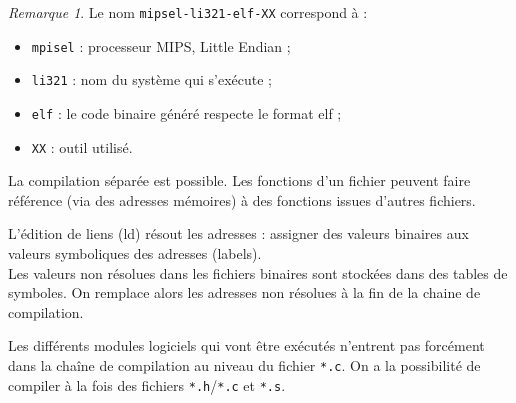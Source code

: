 \documentclass[11pt,english,french]{scrreprt}
\theoremstyle{remark}
\newtheorem*{rem*}{Remarque}
\theoremstyle{definition}
\begin{document}
\begin{rem*}
	Le nom \lstinline!mipsel-li321-elf-XX! correspond à :\begin{itemize}
		\item \lstinline!mpisel! : processeur MIPS, Little Endian ;
		\item \lstinline!li321! : nom du système qui s'exécute ;
		\item \lstinline!elf! : le code binaire généré respecte le format elf ;
		\item \lstinline!XX! : outil utilisé.
	\end{itemize}
\end{rem*}

\begin{figure}[h!]
  \centering
  \qquad            
\end{figure}

La compilation séparée est possible. Les fonctions d'un fichier peuvent faire référence (via des adresses mémoires) à des fonctions issues d'autres fichiers.

L'édition de liens (ld) résout les adresses : assigner des valeurs binaires aux valeurs symboliques des adresses (labels).\\
Les valeurs non résolues dans les fichiers binaires sont stockées dans des tables de symboles. On remplace alors les adresses non résolues à la fin de la chaine de compilation.

Les différents modules logiciels qui vont être exécutés n'entrent pas forcément dans la chaîne de compilation au niveau du fichier \lstinline!*.c!. On a la possibilité de compiler à la fois des fichiers \lstinline!*.h!/\lstinline!*.c! et \lstinline!*.s!.
\end{document}
